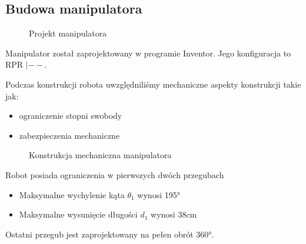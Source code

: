 \subsection{Budowa manipulatora}
\begin{figure}[H]
	\centering
	\caption{Projekt manipulatora} 
\end{figure}
Manipulator został zaprojektowany w programie Inventor. Jego konfiguracja to RPR $|--$.


Podczas konstrukcji robota uwzględniliśmy mechaniczne aspekty konstrukcji takie jak:
\begin{itemize}
	\item ograniczenie stopni swobody
	\item zabezpieczenia mechaniczne
\end{itemize}

\begin{figure}[H]
	\centering
	\caption{Konstrukcja mechaniczna manipulatora} 
\end{figure}
Robot posiada ograniczenia w pierwszych dwóch przegubach
\begin{itemize}
	\item Maksymalne wychylenie kąta $\theta_1$ wynosi 195°
	\item Maksymalne wysunięcie długości $d_1$ wynosi 38cm
\end{itemize}
Ostatni przegub jest zaprojektowany na pełen obrót 360°.


